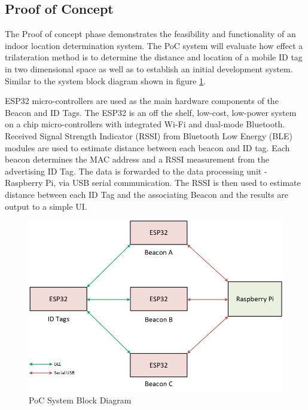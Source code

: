\pagebreak
\subsection{Proof of Concept}
\medskip
The Proof of concept phase demonstrates the feasibility and functionality of an indoor location determination system. The PoC system will evaluate how effect a trilateration method is to determine the distance and location of a mobile  ID tag in two dimensional space as well as to establish an initial development system. Similar to the system block diagram shown in figure \ref{poc}.

\bigskip
ESP32 micro-controllers are used as the main hardware components of the Beacon and ID Tags. The ESP32 is an off the shelf, low-cost, low-power system on a chip micro-controllers with integrated Wi-Fi and dual-mode Bluetooth. Received Signal Strength Indicator (RSSI) from Bluetooth Low Energy (BLE) modules are used to estimate distance between each beacon and ID tag. Each beacon determines the MAC address and a RSSI measurement from the advertising ID Tag. The data is forwarded to the data processing unit - Raspberry Pi, via USB serial communication. The RSSI is then used to estimate distance between each ID Tag and the associating Beacon and the results are output to a simple UI. 

\bigskip
\begin{figure}[H]
\centering
    \includegraphics[width=\linewidth]{./images/01_poc.png}
    \caption{PoC System Block Diagram}
    \label{poc}
\end{figure}



\pagebreak
